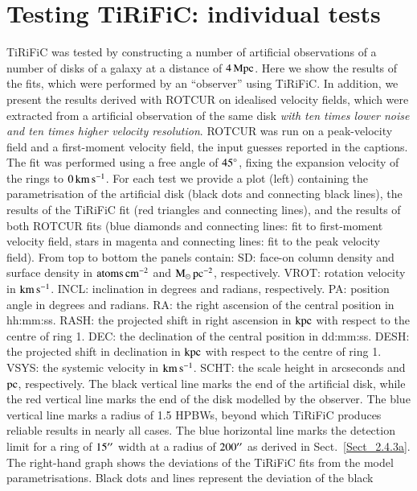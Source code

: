 \documentclass[oldversion]{aa}
\renewcommand{\deg}{\hbox{$^\circ$}}
\begin{document}
\section{Testing TiRiFiC: individual tests}
\label{appendix_B}
TiRiFiC was tested by constructing a number of artificial observations of a
number of  disks of a galaxy at a distance of $4\,\rm
Mpc$. Here we show the results of the fits, which were performed by an
``observer'' using TiRiFiC. In addition, we present the results derived with ROTCUR on idealised velocity fields, which were
extracted from a artificial observation of the same disk \emph{with ten times
lower noise and ten times higher velocity resolution}. ROTCUR was run
on a peak-velocity field and a first-moment velocity field, the input guesses reported in the captions. The fit was performed using a free
angle of $45\deg$, fixing the expansion velocity of the rings to $0\,{\rm
km}\,{\rm s}^{-1}$. For
each test we provide a plot (left) containing the parametrisation
of the artificial disk (black dots and connecting black lines), the results
of the TiRiFiC fit (red triangles and connecting lines), and the
results of both ROTCUR fits (blue diamonds and connecting lines: fit
to first-moment velocity field, stars in magenta and connecting
lines: fit to the peak velocity field). From top to
bottom the panels contain: SD:  face-on column density and surface density in
${\rm atoms}\,{\rm cm}^{-2}$ and ${\rm M}_\odot\,{\rm pc}^{-2}$,
respectively. VROT: rotation velocity in ${\rm km}\,{\rm
s}^{-1}$. INCL: inclination in degrees and radians, respectively. PA:
position angle in degrees and radians. RA: the right ascension of the
central position in hh:mm:ss. RASH: the projected shift in right ascension in $\rm
kpc$ with respect to the centre of ring 1. DEC: the
declination of the central position in dd:mm:ss. DESH: the projected shift in
declination in $\rm kpc$ with respect to the centre of ring
1. VSYS: the systemic velocity in ${\rm km}\,{\rm s}^{-1}$. SCHT: the
scale height in arcseconds and $\rm pc$, respectively. The black
vertical line marks the end of the artificial disk, while the red vertical
line marks the end of the disk modelled by the observer. The blue
vertical line marks a radius of 1.5 HPBWs, beyond which TiRiFiC produces
reliable results in nearly all cases. The blue horizontal line marks
the detection limit for a ring of $15\hbox{$^{\prime\prime}$}$ width at a radius of
$200\hbox{$^{\prime\prime}$}$ as derived in Sect.~\ref{Sect_2.4.3a}. The right-hand
graph shows the deviations of the TiRiFiC fits from the model
parametrisations. Black dots and lines represent the deviation of the black
\end{document}
